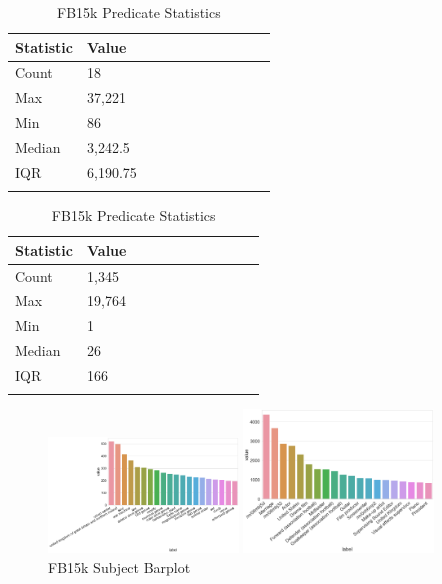 \begin{table}[H]
	\parbox{.5\linewidth}{
		\centering
		\begin{tabular}{lllllllllll}
  			\textbf{Statistic} & \textbf{Value}  \\
  			\hline
			Count & 18 \\
			Max & 37,221  \\
			Min & 86 \\
  			Median & 3,242.5  \\
  			IQR & 6,190.75  \\
			&
		\end{tabular}
		\caption{WN18 Predicate Statistics}
		}
	\hfill
	\parbox{.5\linewidth}{
		\centering
		\begin{tabular}{lllllllllll}
  			\textbf{Statistic} & \textbf{Value}  \\
  			\hline
			Count & 1,345 \\
			Max & 19,764  \\
			Min & 1  \\
  			Median & 26  \\
  			IQR & 166  \\
			&
		\end{tabular}
		\caption{FB15k Predicate Statistics}
		}
\end{table}


\begin{figure}[H]
	\parbox{.5\linewidth}{
   		\centering
    		\includegraphics[width=0.45\textwidth, height=0.2\textheight]{WN18_Subject_Counts}
		\caption{WN18 Subject Barplot}
		}
	\hfill
	\parbox{.5\linewidth}{
   		\centering
		\includegraphics[width=0.45\textwidth, height=0.2\textheight]{FB15k_Subject_Counts}
		\caption{FB15k Subject Barplot}
		}
\end{figure}

